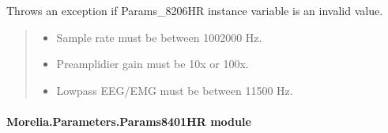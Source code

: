 \documentclass[letterpaper,10pt,english]{sphinxmanual}
\begin{document}
\begin{fulllineitems}
\begin{fulllineitems}
\label{\detokenize{Morelia.Parameters:Morelia.Parameters.Params8274D.Params8274D._CheckParams}}
\pysigstartsignatures
{}
\pysigstopsignatures
\sphinxAtStartPar
Throws an exception if Params\_8206HR instance variable is an invalid value.
\begin{quote}\begin{description}
\begin{itemize}
\item {} 
\sphinxAtStartPar
{} \textendash{} Sample rate must be between 100\sphinxhyphen{}2000 Hz.

\item {} 
\sphinxAtStartPar
{} \textendash{} Preamplidier gain must be 10x or 100x.

\item {} 
\sphinxAtStartPar
{} \textendash{} Low\sphinxhyphen{}pass EEG/EMG must be between 11\sphinxhyphen{}500 Hz.

\end{itemize}

\end{description}\end{quote}

\end{fulllineitems}


\end{fulllineitems}



\paragraph{Morelia.Parameters.Params8401HR module}
\label{\detokenize{Morelia.Parameters:module-Morelia.Parameters.Params8401HR}}\label{\detokenize{Morelia.Parameters:morelia-parameters-params8401hr-module}}
\end{document}

